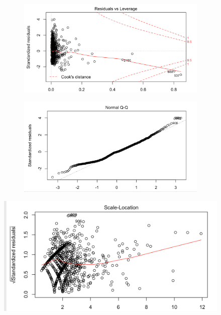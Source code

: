 \documentclass[11pt,letterpaper]{article}
\begin{document}
\begin{figure}[H]
  \centering
  \caption{Diagnostic Plots for Model Predicting Homeless Population Living in Vehicles}
  
  \begin{subfigures}
  \begin{figure}[H]
    \includegraphics[width=\linewidth, height=0.3\textheight]{carhomeless.png}
  \end{figure}
  \begin{figure}[H]
    \includegraphics[width=\linewidth, height=0.3\textheight]{carhomeless2.png}
  \end{figure}
  \end{subfigures}

\end{figure}

\begin{figure}[H]\centering
  \includegraphics[width=\linewidth, height=0.3\textheight]{carhomeless3.png}
\end{figure}
\end{document}

